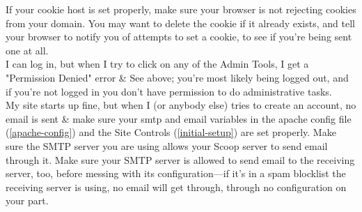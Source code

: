 If your cookie host is set properly, make sure your browser is not rejecting cookies from your domain.  You may want to delete the cookie if it already exists, and tell your browser to notify you of attempts to set a cookie, to see if you're being sent one at all. \\
\hline
I can log in, but when I try to click on any of the Admin Tools, I get a "Permission Denied" error & See above; you're most likely being logged out, and if you're not logged in you don't have permission to do administrative tasks. \\
\hline
My site starts up fine, but when I (or anybody else) tries to create an account, no email is sent & make sure your smtp and email variables in the apache config file (\ref{apache-config}) and the Site Controls (\ref{initial-setup}) are set properly.  Make sure the SMTP server you are using allows your Scoop server to send email through it. Make sure your SMTP server is allowed to send email to the receiving server, too, before messing with its configuration---if it's in a spam blocklist the receiving server is using, no email will get through, through no configuration on your part. \\
\hline
\latex{\end{longtable}}
\html{\end{tabular}}
\html{\end{table}}

